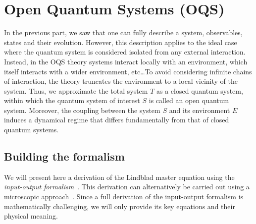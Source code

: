 \section[Open quantum systems]{Open Quantum Systems (OQS)}\label{OQS}
\setlength{\parskip}{2mm}\setlength{\parindent}{6mm}
In the previous part, we saw that one can fully describe a system, observables, states and their evolution. However, this description applies to the ideal case where the quantum system is considered isolated from any external interaction. Instead, in the OQS theory systems interact locally with an environment, which itself interacts with a wider environment, etc\ldots To avoid considering infinite chains of interaction, the theory truncates the environment to a local vicinity of the system. Thus, we approximate the total system $T$ as a closed quantum system, within which the quantum system of interest $S$ is called an open quantum system. Moreover, the coupling between the system $S$ and its environment $E$ induces a dynamical regime that differs fundamentally from that of closed quantum systems.

\subsection{Building the formalism}
We will present here a derivation of the Lindblad master equation using the \textit{input-output formalism}~\cite{Albarelli,GardinerCollett}. This derivation can alternatively be carried out using a microscopic approach~\cite{Breuer}. Since a full derivation of the input-output formalism is mathematically challenging, we will only provide its key equations and their physical meaning.

